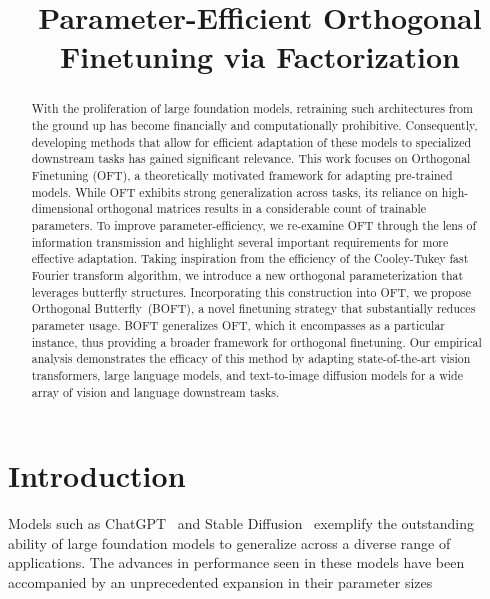 \title{Parameter-Efficient Orthogonal Finetuning via Factorization}

\begin{abstract}
With the proliferation of large foundation models, retraining such architectures from the ground up has become financially and computationally prohibitive. Consequently, developing methods that allow for efficient adaptation of these models to specialized downstream tasks has gained significant relevance. This work focuses on Orthogonal Finetuning (OFT), a theoretically motivated framework for adapting pre-trained models. While OFT exhibits strong generalization across tasks, its reliance on high-dimensional orthogonal matrices results in a considerable count of trainable parameters. To improve parameter-efficiency, we re-examine OFT through the lens of information transmission and highlight several important requirements for more effective adaptation. Taking inspiration from the efficiency of the Cooley-Tukey fast Fourier transform algorithm, we introduce a new orthogonal parameterization that leverages butterfly structures. Incorporating this construction into OFT, we propose Orthogonal Butterfly~(BOFT), a novel finetuning strategy that substantially reduces parameter usage. BOFT generalizes OFT, which it encompasses as a particular instance, thus providing a broader framework for orthogonal finetuning. Our empirical analysis demonstrates the efficacy of this method by adapting state-of-the-art vision transformers, large language models, and text-to-image diffusion models for a wide array of vision and language downstream tasks.
\end{abstract}

\section{Introduction}

Models such as ChatGPT~\cite{brown2020language,chen2021evaluating} and Stable Diffusion~\cite{rombach2022high} exemplify the outstanding ability of large foundation models to generalize across a diverse range of applications. The advances in performance seen in these models have been accompanied by an unprecedented expansion in their parameter sizes

